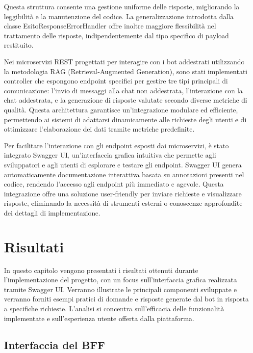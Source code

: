\documentclass[a4paper,twoside,12pt]{toptesi}
\begin{document}
Questa struttura consente una gestione uniforme delle risposte, migliorando la leggibilità e la manutenzione del codice. La generalizzazione introdotta dalla classe EsitoResponseErrorHandler offre inoltre maggiore flessibilità nel trattamento delle risposte, indipendentemente dal tipo specifico di payload restituito.

Nei microservizi REST progettati per interagire con i bot addestrati utilizzando la metodologia RAG (Retrieval-Augmented Generation), sono stati implementati controller che espongono endpoint specifici per gestire tre tipi principali di comunicazione: l'invio di messaggi alla chat non addestrata, l'interazione con la chat addestrata, e la generazione di risposte valutate secondo diverse metriche di qualità. Questa architettura garantisce un'integrazione modulare ed efficiente, permettendo ai sistemi di adattarsi dinamicamente alle richieste degli utenti e di ottimizzare l'elaborazione dei dati tramite metriche predefinite.

Per facilitare l'interazione con gli endpoint esposti dai microservizi, è stato integrato Swagger UI, un'interfaccia grafica intuitiva che permette agli sviluppatori e agli utenti di esplorare e testare gli endpoint. Swagger UI genera automaticamente documentazione interattiva basata su annotazioni presenti nel codice, rendendo l'accesso agli endpoint più immediato e agevole. Questa integrazione offre una soluzione user-friendly per inviare richieste e visualizzare risposte, eliminando la necessità di strumenti esterni o conoscenze approfondite dei dettagli di implementazione.

\chapter{Risultati}

In questo capitolo vengono presentati i risultati ottenuti durante l'implementazione del progetto, con un focus sull'interfaccia grafica realizzata tramite Swagger UI. Verranno illustrate le principali componenti sviluppate e verranno forniti esempi pratici di domande e risposte generate dal bot in risposta a specifiche richieste. L'analisi si concentra sull'efficacia delle funzionalità implementate e sull'esperienza utente offerta dalla piattaforma.

\section{Interfaccia del BFF}
\end{document}
